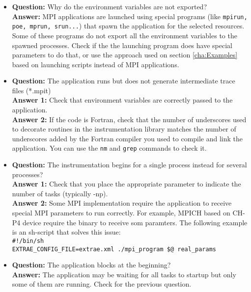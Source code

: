 \begin{itemize}

\item {\bf Question:} Why do the environment variables are not exported?\\
      {\bf Answer:  } MPI applications are launched using special programs (like {\tt mpirun, poe, mprun, srun...}) that spawn the application for the selected resources. Some of these programs do not export all the environment variables to the spawned processes. Check if the the launching program does have special parameters to do that, or use the approach used on section \ref{cha:Examples} based on launching scripts instead of MPI applications.

\item {\bf Question:} The application runs but does not generate intermediate trace files (*.mpit)\\
      {\bf Answer 1:} Check that environment variables are correctly passed to the application.\\
      {\bf Answer 2:} If the code is Fortran, check that the number of underscores used to decorate routines in the instrumentation library matches the number of underscores added by the Fortran compiler you used to compile and link the application. You can use the {\tt nm} and {\tt grep} commands to check it. 

\item {\bf Question:} The instrumentation begins for a single process instead for several processes?\\
      {\bf Answer 1:} Check that you place the appropriate parameter to indicate the number of tasks (typically -np).\\
      {\bf Answer 2:} Some MPI implementation require the application to receive special MPI parameters to run correctly. For example, MPICH based on CH-P4 device require the binary to receive som paramters. The following example is an sh-script that solves this issue:\\
      {\tt \#!/bin/sh\\
           EXTRAE\_CONFIG\_FILE=extrae.xml ./mpi\_program \$@ real\_params}\\

\item {\bf Question:} The application blocks at the beginning?\\
      {\bf Answer:  } The application may be waiting for all tasks to startup but only some of them are running. Check for the previous question.


\end{itemize}
